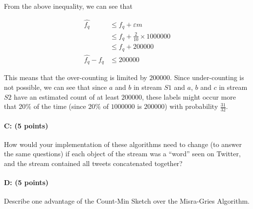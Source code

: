 \documentclass[11pt]{article}
\begin{document}
From the above inequality, we can see that 

\begin{equation*}
\begin{aligned}
\hat{f_q} &\leq f_q + \varepsilon m\\
&\leq f_q + \frac{2}{10} \times \num[group-separator={,}]{1000000}\\
&\leq f_q + \num[group-separator={,}]{200000}\\
\hat{f_q} - f_q  &\leq \num[group-separator={,}]{200000}
\end{aligned}
\end{equation*}

This means that the over-counting is limited by $\num[group-separator={,}]{200000}$. Since under-counting is not possible, we can see that since $a$ and $b$ in stream $S1$ and $a$, $b$ and $c$ in stream $S2$ have an estimated count of at least $\num[group-separator={,}]{200000}$, these labels might occur more that $20\%$ of the time (since $20\%$ of $\num[group-separator={,}]{1000000}$ is $\num[group-separator={,}]{200000}$) with probability $\frac{31}{32}$.

\paragraph{C: (5 points)} 
How would your implementation of these algorithms need to change (to answer the same questions) if each object of the stream was a \enquote{word} seen on Twitter, and the stream contained all tweets concatenated together?

\paragraph{D: (5 points)} 
Describe one advantage of the Count-Min Sketch over the Misra-Gries Algorithm.
\end{document}
